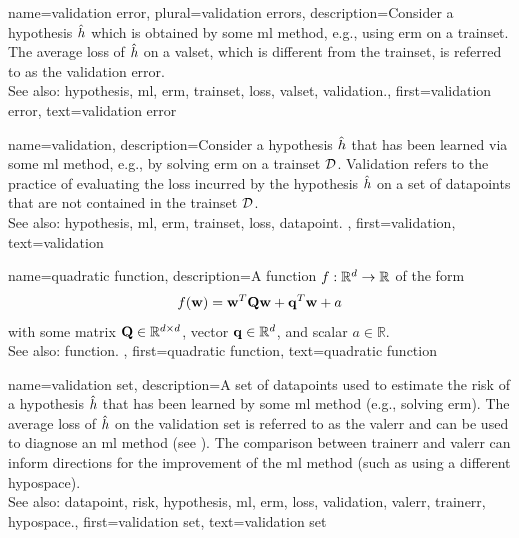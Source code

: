 {name={validation error}, plural={validation errors},
 	description={Consider a \gls{hypothesis} $\hat{h}$ which is 
 		obtained by some \gls{ml} method, e.g., using \gls{erm} on a \gls{trainset}. The average \gls{loss} 
 		of $\hat{h}$ on a \gls{valset}, which is different from the \gls{trainset}, is referred 
 		to as the \gls{validation} error.
			\\
		See also: \gls{hypothesis}, \gls{ml}, \gls{erm}, \gls{trainset}, \gls{loss}, \gls{valset}, \gls{validation}.},
	first={validation error},
	text={validation error}  
}

{name={validation},
	description={Consider a \gls{hypothesis} $\hat{h}$ that has been 
		learned via some \gls{ml} method, e.g., by solving \gls{erm} on a \gls{trainset} $\mathcal{D}$. 
		Validation refers to the practice of evaluating the \gls{loss} incurred by the 
		\gls{hypothesis} $\hat{h}$ on a set of 
		\glspl{datapoint} that are not contained in the \gls{trainset} $\mathcal{D}$.
				\\
		See also: \gls{hypothesis}, \gls{ml}, \gls{erm}, \gls{trainset}, \gls{loss}, \gls{datapoint}. },
	first={validation},
	text={validation}  
}

{name={quadratic function},
	description={A \gls{function} $f: \mathbb{R}^{d} \rightarrow \mathbb{R}$ of the form 
		$$f({\bf w}) =  {\bf w}^{T} \mathbf{Q} \mathbf{w} + \mathbf{q}^{T} {\bf w}+a$$ with 
		some matrix $\mathbf{Q} \in \mathbb{R}^{d \times d}$, vector ${\bf q} \in \mathbb{R}^{d}$, 
		and scalar $a \in \mathbb{R}$.
		\\
		See also: \gls{function}. },
	first={quadratic function},
	text={quadratic function}  
}

{name={validation set},
 	description={A set of \glspl{datapoint} used to estimate 
  		the \gls{risk} of a \gls{hypothesis} $\hat{h}$ that has been learned by some 
  		\gls{ml} method (e.g., solving \gls{erm}). The average \gls{loss} of $\hat{h}$ 
  		on the \gls{validation} set is referred to as the \gls{valerr} and can be used to diagnose an 
  		\gls{ml} method (see \cite[Sec. 6.6]{MLBasics}). The comparison between \gls{trainerr} 
  		and \gls{valerr} can inform directions for the improvement of the \gls{ml} method (such as 
  		using a different \gls{hypospace}).
			\\
		See also: \gls{datapoint}, \gls{risk}, \gls{hypothesis}, \gls{ml}, \gls{erm}, \gls{loss}, \gls{validation}, \gls{valerr}, \gls{trainerr}, \gls{hypospace}.},
	first={validation set},
	text={validation set}  
}

